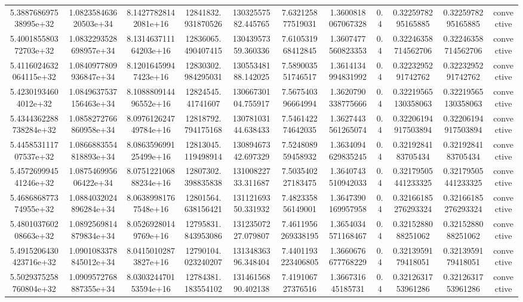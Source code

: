 \begin{table}
\begin{tabular}{ccccccccccc}
5.388768697538995e+32 & 1.082358463620503e+34 & 8.14277828142081e+16 & 12841832.931870526 & 13032557582.445765 & 7.632125877519031 & 1.3600818067067328 & 0.4 & 0.3225978295165885 & 0.3225978295165885 & convective \\
5.400185580372703e+32 & 1.0832293528698957e+34 & 8.131463711164203e+16 & 12836065.490407415 & 13043957359.360336 & 7.610531968412845 & 1.3607477560823353 & 0.4 & 0.32246358714562706 & 0.32246358714562706 & convective \\
5.4116024632064115e+32 & 1.0840977809936847e+34 & 8.12016459947423e+16 & 12830302.984295031 & 13055348188.142025 & 7.589003551746517 & 1.3614134994831992 & 0.4 & 0.3223295291742762 & 0.3223295291742762 & convective \\
5.42301934604012e+32 & 1.0849637537156463e+34 & 8.108880914496552e+16 & 12824545.41741607 & 13066730104.755917 & 7.567540396664994 & 1.3620790338775666 & 0.4 & 0.32219565130358063 & 0.32219565130358063 & convective \\
5.4344362288738284e+32 & 1.0858272766860958e+34 & 8.097612624749784e+16 & 12818792.794175168 & 13078103144.638433 & 7.546142274642035 & 1.3627443561265074 & 0.4 & 0.32206194917503894 & 0.32206194917503894 & convective \\
5.445853111707537e+32 & 1.0866883554818893e+34 & 8.086359699125499e+16 & 12813045.119498914 & 13089467342.697329 & 7.524808959458932 & 1.3634094629835245 & 0.4 & 0.3219284183705434 & 0.3219284183705434 & convective \\
5.457269994541246e+32 & 1.087546995606422e+34 & 8.075122106888234e+16 & 12807302.398835838 & 13100822733.311687 & 7.503540227183475 & 1.3640743510942033 & 0.4 & 0.32179505441233325 & 0.32179505441233325 & convective \\
5.468686877374955e+32 & 1.0884032024896284e+34 & 8.06389981767548e+16 & 12801564.638156421 & 13112169350.331932 & 7.482335856149001 & 1.3647390169957958 & 0.4 & 0.32166185276293324 & 0.32166185276293324 & convective \\
5.480103760208663e+32 & 1.0892569814879834e+34 & 8.05269280149769e+16 & 12795831.843953086 & 13123507227.079807 & 7.4611956269338195 & 1.3654034571168467 & 0.4 & 0.3215288088251062 & 0.3215288088251062 & convective \\
5.4915206430423716e+32 & 1.0901083378845012e+34 & 8.04150102873827e+16 & 12790104.023240207 & 13134836396.348404 & 7.4401193223406805 & 1.3660676677768229 & 0.4 & 0.3213959179418051 & 0.3213959179418051 & convective \\
5.5029375258760804e+32 & 1.0909572768887355e+34 & 8.030324470153594e+16 & 12784381.183554102 & 13146156890.402138 & 7.419106727376516 & 1.366731645185731 & 0.4 & 0.3212631753961286 & 0.3212631753961286 & convective \\

\end{tabular}
\end{table}
